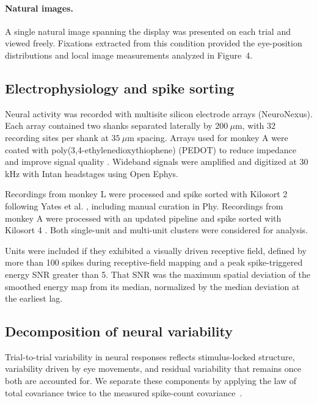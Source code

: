 \documentclass{lite}
\begin{document}
\paragraph{Natural images.} A single natural image spanning the display was
presented on each trial and viewed freely. Fixations extracted from this condition
provided the eye-position distributions and local image measurements analyzed in
Figure~4.

\subsection{Electrophysiology and spike sorting}

Neural activity was recorded with multisite silicon electrode arrays (NeuroNexus). Each array contained two shanks separated laterally by $200~\mu\mathrm{m}$, with 32 recording sites per shank at $35~\mu\mathrm{m}$ spacing. Arrays used for monkey A were coated with poly(3,4-ethylenedioxythiophene) (PEDOT) to reduce impedance and improve signal quality \cite{cui2003electrochemical}. Wideband signals were amplified and digitized at 30 kHz with Intan headstages using Open Ephys.

Recordings from monkey L were processed and spike sorted with Kilosort 2 following Yates et al. \cite{yates2023detailed}, including manual curation in Phy. Recordings from monkey A were processed with an updated pipeline and spike sorted with Kilosort 4 \cite{roth2026flexible}. Both single-unit and multi-unit clusters were considered for analysis.

Units were included if they exhibited a visually driven receptive field, defined by more than 100 spikes during receptive-field mapping and a peak spike-triggered energy SNR greater than 5. That SNR was the maximum spatial deviation of the smoothed energy map from its median, normalized by the median deviation at the earliest lag.

\subsection{Decomposition of neural variability}

Trial-to-trial variability in neural responses reflects stimulus-locked structure, variability driven by eye movements, and residual variability that remains once both are accounted for. We separate these components by applying the law of total covariance twice to the measured spike-count covariance~\cite{mcfarland2016variability}.
\end{document}
